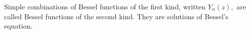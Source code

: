 Simple combinations of Bessel functions of the first kind, written $Y_{n}(z),$  are called Bessel functions of the second kind.
They are solutions of Bessel's equation.